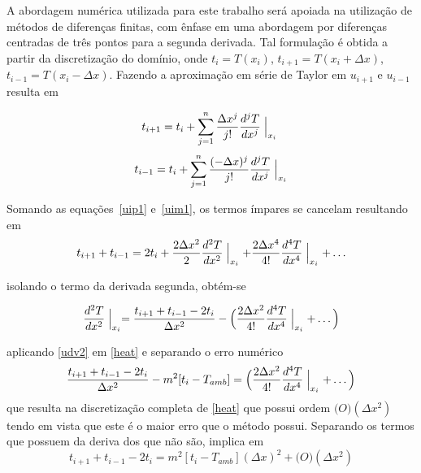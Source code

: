 \documentclass[a4paper, 12pt]{article}
\begin{document}
A abordagem numérica utilizada para este trabalho será apoiada na utilização de métodos de diferenças finitas, com ênfase em uma abordagem por diferenças centradas de três pontos para a 
segunda derivada. 
Tal formulação é obtida a partir da discretização do domínio, onde $t_i = T(x_i)$, $t_{i+1} = T(x_i + \Delta x)$, $t_{i-1} = T(x_i - \Delta x)$. 
Fazendo a aproximação em série de Taylor em $u_{i+1}$ e $u_{i-1}$ resulta em 

\begin{equation}
  \label{uip1}
  t_{i+1} = t_i+\sum_{j=1}^n \frac{\Delta x^j}{j!}\frac{d^jT}{dx^j}\Bigm\lvert_{x_i} \\ 
\end{equation}
\begin{equation}
  \label{uim1}
  t_{i-1} = t_i+\sum_{j=1}^n \frac{(-\Delta x)^j}{j!}\frac{d^jT}{dx^j}\Bigm\lvert_{x_i}
\end{equation}

Somando as equações~\ref{uip1} e~\ref{uim1}, os termos ímpares se cancelam resultando em 
\begin{equation}
  \label{uims}
  t_{i+1}+t_{i-1}= 2t_i + \frac{2\Delta x^2}{2}\frac{d^2T}{dx^2}\Bigm\lvert_{x_i} + \frac{2\Delta x^4}{4!}\frac{d^4T}{dx^4}\Bigm\lvert_{x_i} + \ldots
\end{equation}

isolando o termo da derivada segunda, obtém-se

\begin{equation}
  \label{udv2}
  \frac{d^2T}{dx^2}\Bigm\lvert_{x_i}=\frac{t_{i+1}+t_{i-1} - 2t_i}{\Delta x^2} - \Big( \frac{2\Delta x^2}{4!}\frac{d^4T}{dx^4}\Bigm\lvert_{x_i} + \ldots \Big)  
\end{equation}

aplicando \ref{udv2} em \ref{heat} e separando o erro numérico 
\begin{equation}
  \label{udv2n}
  \frac{t_{i+1}+t_{i-1} - 2t_i}{\Delta x^2} - m^2 [t_i - T_{amb}] = \Big( \frac{2\Delta x^2}{4!}\frac{d^4T}{dx^4}\Bigm\lvert_{x_i} + \ldots \Big) 
\end{equation}
que resulta na discretização completa de \ref{heat} que possui ordem $\mathcal(O)(\Delta x^2)$ tendo em vista que este é o maior erro que o método possui. Separando os termos que possuem da deriva dos que não são, implica em
\begin{equation}
  \label{udv2r}
  t_{i+1}+t_{i-1} - 2t_i = m^2 [t_i - T_{amb}] (\Delta x)^2+\mathcal(O)(\Delta x^2)
\end{equation}
\end{document}
